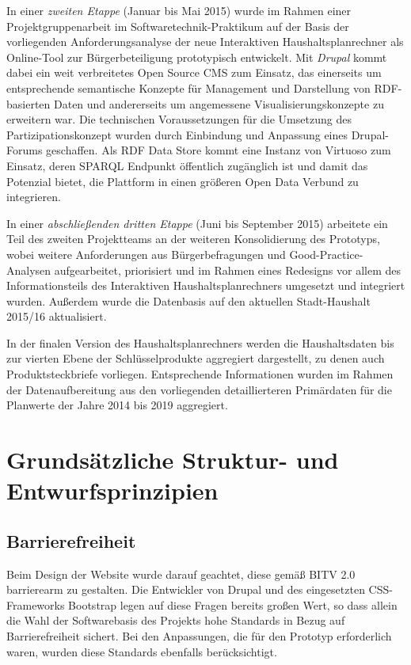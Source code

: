 \documentclass[a4paper,11pt,twoside]{article}
\begin{document}
In einer \emph{zweiten Etappe} (Januar bis Mai 2015) wurde im Rahmen einer
Projektgruppenarbeit im Softwaretechnik-Praktikum auf der Basis der
vorliegenden Anforderungsanalyse der neue Interaktiven Haushaltsplanrechner als
Online-Tool zur Bürgerbeteiligung prototypisch entwickelt.  Mit \emph{Drupal}
kommt dabei ein weit verbreitetes Open Source CMS zum Einsatz, das einerseits
um entsprechende semantische Konzepte für Management und Darstellung von
RDF-basierten Daten und andererseits um angemessene Visualisierungskonzepte zu
erweitern war. Die technischen Voraussetzungen für die Umsetzung des
Partizipationskonzept wurden durch Einbindung und Anpassung eines Drupal-Forums
geschaffen.  Als RDF Data Store kommt eine Instanz von Virtuoso zum Einsatz,
deren SPARQL Endpunkt öffentlich zugänglich ist und damit das Potenzial bietet,
die Plattform in einen größeren Open Data Verbund zu integrieren.

In einer \emph{abschließenden dritten Etappe} (Juni bis September 2015)
arbeitete ein Teil des zweiten Projektteams an der weiteren Konsolidierung des
Prototyps, wobei weitere Anforderungen aus Bürgerbefragungen und
Good-Practice-Analysen aufgearbeitet, priorisiert und im Rahmen eines Redesigns
vor allem des Informationsteils des Interaktiven Haushaltsplanrechners
umgesetzt und integriert wurden.  Außerdem wurde die Datenbasis auf den
aktuellen Stadt-Haushalt 2015/16 aktualisiert. 

In der finalen Version des Haushaltsplanrechners werden die Haushaltsdaten bis
zur vierten Ebene der Schlüsselprodukte aggregiert dargestellt, zu denen auch
Produktsteckbriefe vorliegen. Entsprechende Informationen wurden im Rahmen der
Datenaufbereitung aus den vorliegenden detaillierteren Primärdaten für die
Planwerte der Jahre 2014 bis 2019 aggregiert.

\section{Grundsätzliche Struktur- und Entwurfsprinzipien}

\subsection{Barrierefreiheit}

Beim Design der Website wurde darauf geachtet, diese gemäß BITV 2.0 \cite{bitv}
barrierearm zu gestalten.  Die Entwickler von Drupal und des eingesetzten
CSS-Frameworks Bootstrap legen auf diese Fragen bereits großen Wert, so dass
allein die Wahl der Softwarebasis des Projekts hohe Standards in Bezug auf
Barrierefreiheit sichert. Bei den Anpassungen, die für den Prototyp
erforderlich waren, wurden diese Standards ebenfalls berücksichtigt. 
\end{document}
